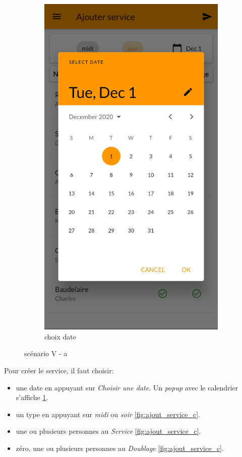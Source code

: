 \begin{figure}[!h]
\begin{subfigure}{.3\textwidth}
            \includegraphics[width=0.9\linewidth]{screenshots/scenario_05/ajout_service_b.png}
            \caption{choix date}
            \label{fig:choix_date}
        \end{subfigure}
        \caption{scénario V - a}
        \label{fig:scen05a}
    \end{figure}

    Pour créer le service, il faut choisir:
    \smallskip
    \begin{itemize}
        \item une date en appuyant sur \textit{Choisir une date}. Un \textit{popup} avec le calendrier s'affiche \ref{fig:choix_date}.
        \item un type en appuyant sur \textit{midi} ou \textit{soir} \ref{fig:ajout_service_c}. 
        \item une ou plusieurs personnes au \textit{Service} \ref{fig:ajout_service_c}.
        \item zéro, une ou plusieurs personnes au \textit{Doublage} \ref{fig:ajout_service_c}.
    \end{itemize}
    
